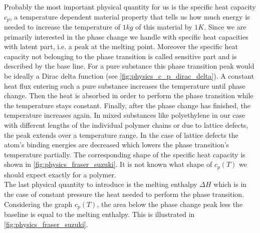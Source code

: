 \documentclass{scrartcl}[12pt, halfparskip]
\numberwithin{equation}{section}
\numberwithin{figure}{section}
\numberwithin{table}{section}
\begin{document}
Probably the most important physical quantity for us is the specific heat capacity $c_p$, a temperature dependent material property that tells us how much energy is needed to increase the temperature of $1kg$ of this material by $1K$. 
Since we are primarily interested in the phase change we handle with specific heat capacities with latent part, i.e. a peak at the melting point. Moreover the specific heat capacity not belonging to the phase transition is called sensitive part and is described by the base line. 
For a pure substance this phase transition peak would be ideally a Dirac delta function (see  \cref{fig:physics_c_p_dirac_delta}). A constant heat flux entering such a pure substance increases the temperature until phase change. Then the heat is absorbed in order to perform the phase transition while the temperature stays constant. Finally, after the phase change has finished, the temperature increases again. 
In mixed substances like polyethylene in our case with different lengths of the individual polymer chains or due to lattice defects, the peak extends over a temperature range. In the case of lattice defects the atom's binding energies are decreased which lowers the phase transition's temperature partially. The corresponding shape of the specific heat capacity is shown in \cref{fig:physics_fraser_suzuki}. It is not known what shape of $c_p(T)$ we should expect exactly for a polymer. \\
The last physical quantity to introduce is the melting enthalpy $\Delta H$ which is in the case of constant pressure the heat needed to perform the phase transition. Considering the graph $c_p(T)$, the area below the phase change peak less the baseline is equal to the melting enthalpy. This is illustrated in \cref{fig:physics_fraser_suzuki}.
\end{document}
